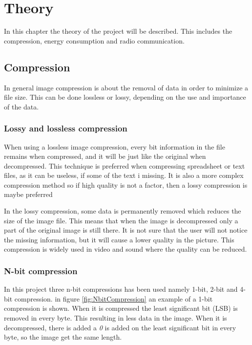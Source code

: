 \chapter{Theory}
\label{chp:theory}

In this chapter the theory of the project will be described. This includes the compression, energy consumption and radio communication.

\section{Compression}
In general image compression is about the removal of data in order to minimize a file size. This can be done lossless or lossy, depending on the use and importance of the data.

\subsection{Lossy and lossless compression}
When using a lossless image compression, every bit information in the file remains when compressed, and it will be just like the original when decompressed. This technique is preferred when compressing spreadsheet or text files, as it can be useless, if some of the text i missing. It is also a more complex compression method so if high quality is not a factor, then a lossy compression is maybe preferred 

In the lossy compression, some data is permanently removed which reduces the size of the image file. This means that when the image is decompressed only a part of the original image is still there. It is not sure that the user will not notice the missing information, but it will cause a lower quality in the picture. This compression is widely used in video and sound where the quality can be reduced.  

\subsection{N-bit compression}
In this project three n-bit compressions has been used namely 1-bit, 2-bit and 4-bit compression. in figure \ref{fig:NbitCompression} an example of a 1-bit compression is shown. When it is compressed the least significant bit (LSB) is removed in every byte. This resulting in less data in the image. When it is decompressed, there is added a \emph{0} is added on the least significant bit in every byte, so the image get the same length. 


